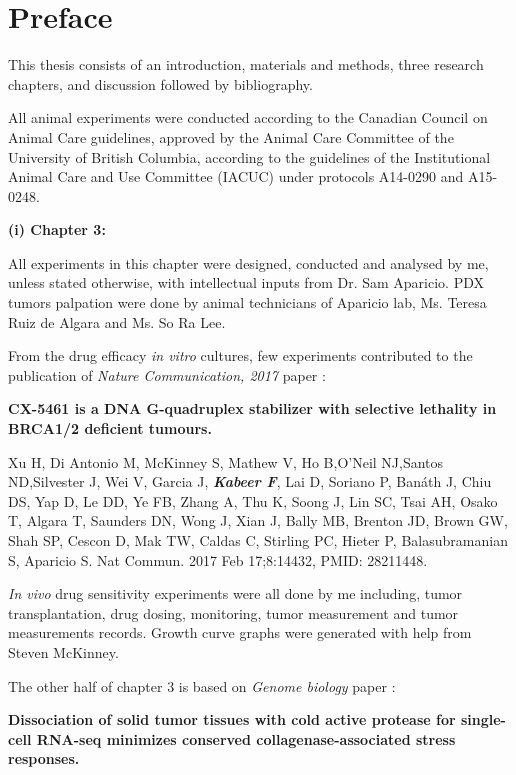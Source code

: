 
\chapter{Preface}
This thesis consists of an introduction, materials and methods, three research chapters, and discussion followed by bibliography.

All animal experiments were conducted according to the Canadian Council on Animal Care guidelines, approved by the Animal Care Committee of the University of British Columbia, according to the guidelines of the Institutional Animal Care and Use Committee (IACUC) under protocols A14-0290 and A15-0248.
  
  \textbf{(i) Chapter 3:}

All experiments in this chapter were designed, conducted and analysed by me, unless stated otherwise, with intellectual inputs from Dr. Sam Aparicio. PDX tumors palpation were done by animal technicians of Aparicio lab, Ms. Teresa Ruiz de Algara and Ms. So Ra Lee.


From the drug efficacy \textit{in vitro} cultures, few experiments contributed to the publication of \textit{Nature Communication, 2017} paper \cite{xu2017cx}:

\textbf{CX-5461 is a DNA G-quadruplex stabilizer with selective lethality in BRCA1/2 deficient tumours.}

Xu H, Di Antonio M, McKinney S, Mathew V, Ho B,O'Neil NJ,Santos ND,Silvester J, Wei V, Garcia J, \emph{\textbf{Kabeer F}}, Lai D, Soriano P, Banáth J, Chiu DS, Yap D, Le DD, Ye FB, Zhang A, Thu K, Soong J, Lin SC, Tsai AH, Osako T, Algara T, Saunders DN, Wong J, Xian J, Bally MB, Brenton JD, Brown GW, Shah SP, Cescon D, Mak TW, Caldas C, Stirling PC, Hieter P, Balasubramanian S, Aparicio S. Nat Commun. 2017 Feb 17;8:14432, PMID: 28211448.



 \textit{In vivo} drug sensitivity experiments were all done by me including, tumor transplantation, drug dosing, monitoring, tumor measurement and tumor measurements records. Growth curve graphs were generated with help from Steven McKinney.


The other half of chapter 3 is based on \textit{Genome biology} paper \cite{o2019dissociation}:


\textbf{Dissociation of solid tumor tissues with cold active protease for single-cell RNA-seq minimizes conserved collagenase-associated stress responses.}

